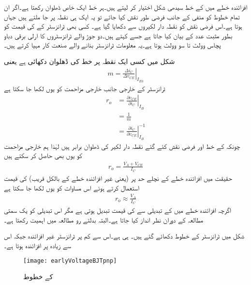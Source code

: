افزائندہ خطے میں  کے خط سیدھی شکل اختیار کر لیتے ہیں۔ہر خط ایک خاص ڈھلوان رکھتا ہے۔اگر ان تمام خطوط کو منفی  کے جانب فرضی طور نقش کیا جائے تو یہ ایک ہی نقطہ پر جا ملتے ہیں جہاں  ہوتا ہے۔اس فرضی نقش کو نقطہ دار لکیروں سے دکھایا گیا ہے۔ کسی بھی ٹرانزسٹر کے  کی قیمت کو بطور مثبت عدد کے بیان کیا جاتا ہے جسے   کہتے ہیں۔دو جوڑ والے ٹرانزسٹروں کا ارلی برقی دباو پچاس وولٹ تا سو وولٹ ہوتا ہے۔یہ معلومات ٹرانزسٹر بنانے والے صنعت کار مہیا کرتے ہیں۔	

شکل   میں کسی ایک نقطہ پر خط کی ڈھلوان  دکھائی ہے یعنی
\begin{align*}
m=\left . \frac{\Delta i_C}{\Delta v_{CE}}\right |_{I_{B3}}
\end{align*}
ٹرانزسٹر کے خارجی جانب خارجی مزاحمت   کو یوں لکھا جا سکتا ہے
\begin{align*}
r_o &=\left . \frac{\partial v_{CE}}{\partial i_C}\right |_{I_B}\\
&=\frac{1}{m}\\
&= \left. \frac{\partial i_C}{\partial v_{CE}}\right |_{I_B}^{-1}
\end{align*}
چونکہ  کے خط اور فرضی نقش کئے گئے نقطہ دار لکیر کی ڈھلوان برابر ہیں لہٰذا ہم خارجی مزاحمت کو یوں بھی حاصل کر سکتے ہیں
\begin{align} \label{مساوات_ٹرانزسٹر_باریک_خارجی_مزاحمت_حتمی}
r_o = \frac{V_A+V_{CE}}{I_C}
\end{align}
حقیقت میں افزائندہ خطے کے نچلے حد پر (یعنی غیر افزائندہ خطے کے بالکل قریب) کی قیمت  استعمال کرتے ہوئے اس مساوات کو یوں لکھا جا سکتا ہے
\begin{align} \label{مساوات_ٹرانزسٹر_باریک_خارجی_مزاحمت}
r_o \approx \frac{V_A}{I_C}
\end{align}
اگرچہ افزائندہ خطے میں   کے تبدیلی سے  کی قیمت تبدیل ہوتی ہے مگر اس تبدیلی کو یک سمتی مطالعہ کے دوران نظر انداز کیا جاتا ہے۔البتہ بدلتے رو مطالعہ میں  اہمیت رکھتا ہے۔

شکل  میں  ٹرانزسٹر کے  خطوط دکھائے گئے ہیں۔ ہی ہے۔اس سے کم  پر ٹرانزسٹر غیر افزائندہ جبکہ اس سے زیادہ پر افزائندہ  ہوتا ہے۔

\begin{figure}
\centering
\texttt{[image: earlyVoltageBJTpnp]}
\caption{ کے  خطوط}
\label{شکل_ارلی_برقی_دباو_جمع_منفی_جمع_ٹرانزسٹر}
\end{figure}

